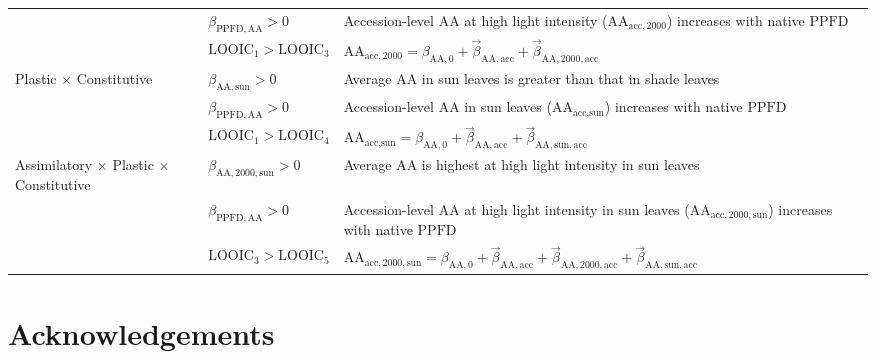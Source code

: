 \documentclass[
  letterpaper,
  DIV=11,
  numbers=noendperiod]{scrartcl}
\newcommand{\aax}{$\mathrm{AA}$}
\newcommand{\ppfd}{$\mathrm{PPFD}$}
\begin{document}
\begin{longtable}{>{\raggedright\arraybackslash}p{1in}>{\raggedright\arraybackslash}p{1.5in}>{\raggedright\arraybackslash}p{3in}}
\nopagebreak
 & $\beta_{\mathrm{PPFD,AA}} > 0$ & \hspace{-1em}Accession-level \aax{} at high light intensity ($\mathrm{AA}_{\text{acc},2000}$) increases with native \ppfd\\
\nopagebreak
 & $\text{LOOIC}_\text{1} > \text{LOOIC}_\text{3}$ & \hspace{-1em}$\mathrm{AA}_{\text{acc},2000} = \beta_{\mathrm{AA}, 0} + \vec{\beta}_{\mathrm{AA}, \text{acc}} + \vec{\beta}_{\mathrm{AA}, 2000, \text{acc}}$\\
\cmidrule{1-3}\pagebreak[0]
Plastic $\times$ Constitutive & $\beta_{\mathrm{AA},\text{sun}} > 0$ & \hspace{-1em}Average \aax{} in sun leaves is greater than that in shade leaves\\
\nopagebreak
 & $\beta_{\mathrm{PPFD,AA}} > 0$ & \hspace{-1em}Accession-level \aax{} in sun leaves ($\mathrm{AA}_{\text{acc},\text{sun}}$) increases with native \ppfd\\
\nopagebreak
 & $\text{LOOIC}_\text{1} > \text{LOOIC}_\text{4}$ & \hspace{-1em}$\mathrm{AA}_{\text{acc},\text{sun}} = \beta_{\mathrm{AA}, 0} + \vec{\beta}_{\mathrm{AA}, \text{acc}} + \vec{\beta}_{\mathrm{AA}, \text{sun}, \text{acc}}$\\
\cmidrule{1-3}\pagebreak[0]
Assimilatory $\times$ Plastic $\times$ Constitutive & $\beta_{\mathrm{AA},2000,\text{sun}} > 0$ & \hspace{-1em}Average \aax{} is highest at high light intensity in sun leaves\\
\nopagebreak
 & $\beta_{\mathrm{PPFD,AA}} > 0$ & \hspace{-1em}Accession-level \aax{} at high light intensity in sun leaves ($\mathrm{AA}_{\text{acc},2000,\text{sun}}$) increases with native \ppfd\\
\nopagebreak
 & $\text{LOOIC}_\text{3} > \text{LOOIC}_\text{5}$ & \hspace{-1em}$\mathrm{AA}_{\text{acc},2000,\text{sun}} = \beta_{\mathrm{AA}, 0} + \vec{\beta}_{\mathrm{AA}, \text{acc}} + \vec{\beta}_{\mathrm{AA}, 2000, \text{acc}} + \vec{\beta}_{\mathrm{AA}, \text{sun}, \text{acc}}$\\
\bottomrule

\end{longtable}

\section{Acknowledgements}\label{acknowledgements}
\end{document}
